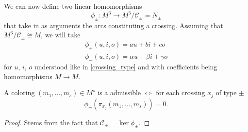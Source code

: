 We can now define two linear homomorphisms
$$\phi_\pm:M^3\to M^3/\mathcal{C}_\pm=N_\pm$$
that take in as arguments the arcs constituting a crossing. Assuming that $M^3/\mathcal{C}_\pm\cong M$, we will take 
\begin{align}
  \phi_+(u,i,o)=au+bi+co \label{phi equations1} \\ 
  \phi_-(u,i,o)=\alpha u+\beta i+\gamma o \label{phi equations2}
\end{align}
for $u$, $i$, $o$ understood like in \cref{crossing_type} and with coefficients being homomorphisms $M\to M$.

\begin{proposition}\label{proposition male kernel kolorowania}
  A coloring $(m_1,..., m_s)\in M^s$ is a admissible $\iff$ for each crossing $x_j$ of type $\pm$ 
  $$\phi_\pm(\pi_{x_j}(m_1,...,m_s))=0.$$
\end{proposition}

\begin{proof}
  Stems from the fact that $\mathcal{C}_\pm=\ker\phi_\pm$.
\end{proof}

